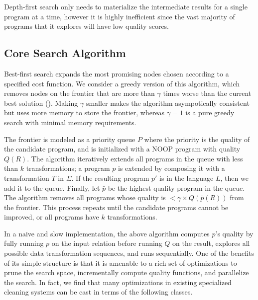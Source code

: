 
 Depth-first search only needs to materialize the intermediate results for a single program at a time, however it is highly inefficient since the vast majority of programs that it explores will have low quality scores.  


\subsection{Core Search Algorithm}
Best-first search expands the most promising nodes chosen according to a specified cost function.
We consider a greedy version of this algorithm, which removes nodes on the frontier that are more than $\gamma$ times worse than the current best solution ().
Making $\gamma$ smaller makes the algorithm asympotically consistent but uses more memory to store the frontier, whereas $\gamma=1$ is a pure greedy search with minimal memory requirements.  

The frontier is modeled as a priority queue $P$ where the priority is the quality of the candidate program, and is initialized with a NOOP program with quality $Q(R)$.  
The algorithm iteratively extends all programs in the queue with less than $k$ transformations; a program $p$ is extended by composing it with a transformation $T$ in $\Sigma$.  If the resulting program $p'$ is in the language $L$, then we add it to the queue.
Finally, let $\bar{p}$ be the highest quality program in the queue.  The algorithm removes all programs whose quality is $<\gamma\times Q(\bar{p}(R))$ from the frontier.  
This process repeats until the candidate programs cannot be improved, or all programs have $k$ transformations.

In a naive and slow implementation, the above algorithm computes $p$'s quality by fully running $p$ on the input relation before running $Q$ on the result, explores all possible data transformation sequences, and runs sequentially.  One of the benefits of its simple structure is that it is amenable to a rich set of optimizations to prune the search space, incrementally compute quality functions, and parallelize the search.  In fact, we find that many optimizations in existing specialized cleaning systems can be cast in terms of the following classes.

